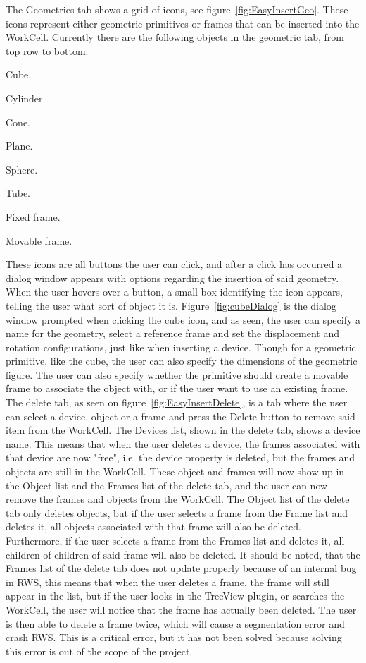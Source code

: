 The Geometries tab shows a grid of icons, see figure~\ref{fig:EasyInsertGeo}. These icons represent either geometric primitives or frames that can be inserted into the WorkCell. Currently there are the following objects in the geometric tab, from top row to bottom:
\begin{enumerate*}[font={\color{red!50!black}\bfseries}]
\item Cube.
\item Cylinder.
\item Cone.
\item Plane.
\item Sphere.
\item Tube.
\item Fixed frame.
\item Movable frame.
\end{enumerate*}
These icons are all buttons the user can click, and after a click has occurred a dialog window appears with options regarding the insertion of said geometry. When the user hovers over a button, a small box identifying the icon appears, telling the user what sort of object it is. Figure~\ref{fig:cubeDialog} is the dialog window prompted when clicking the cube icon, and as seen, the user can specify a name for the geometry, select a reference frame and set the displacement and rotation configurations, just like when inserting a device. Though for a geometric primitive, like the cube, the user can also specify the dimensions of the geometric figure. The user can also specify whether the primitive should create a movable frame to associate the object with, or if the user want to use an existing frame.\\

The delete tab, as seen on figure~\ref{fig:EasyInsertDelete}, is a tab where the user can select a device, object or a frame and press the Delete button to remove said item from the WorkCell. The Devices list, shown in the delete tab, shows a device name. This means that when the user deletes a device, the frames associated with that device are now "free", i.e. the device property is deleted, but the frames and objects are still in the WorkCell. These object and frames will now show up in the Object list and the Frames list of the delete tab, and the user can now remove the frames and objects from the WorkCell. The Object list of the delete tab only deletes objects, but if the user selects a frame from the Frame list and deletes it, all objects associated with that frame will also be deleted. Furthermore, if the user selects a frame from the Frames list and deletes it, all children of children of said frame will also be deleted. It should be noted, that the Frames list of the delete tab does not update properly because of an internal bug in RWS, this means that when the user deletes a frame, the frame will still appear in the list, but if the user looks in the TreeView plugin, or searches the WorkCell, the user will notice that the frame has actually been deleted. The user is then able to delete a frame twice, which will cause a segmentation error and crash RWS. This is a critical error, but it has not been solved because solving this error is out of the scope of the project.



